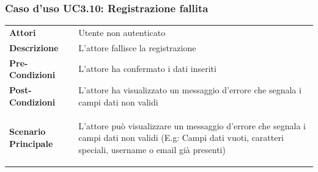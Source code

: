 \subsubsection{Caso d'uso UC3.10: Registrazione fallita}
\label{UC3_10}

\begin{minipage}{\linewidth}
	\begin{longtable}{ l | p{11cm}}
		\hline
		\rowcolor{Gray}
	 	\multicolumn{2}{c}{UC3.10 - Registrazione fallita} \\
	 	\hline
		\textbf{Attori} & Utente non autenticato \\
		\textbf{Descrizione} & L'attore fallisce la registrazione  \\
		\textbf{Pre-Condizioni} & L'attore ha confermato i dati inseriti \\
		\textbf{Post-Condizioni} & L'attore ha visualizzato un messaggio d'errore che segnala i campi dati non validi \\
		\textbf{Scenario Principale} & 
		\begin{enumerate*}[label=(\arabic*.),itemjoin={\newline}]
			\item L'attore può visualizzare un messaggio d'errore che segnala i campi dati non validi (E.g: Campi dati vuoti, caratteri speciali, username o email già presenti) 
		\end{enumerate*}\\
	\end{longtable}
\end{minipage}